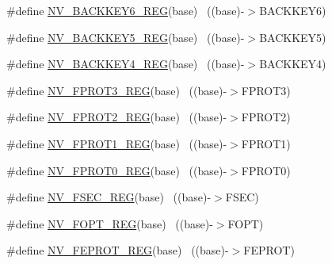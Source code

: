\begin{DoxyCompactItemize}
\item 
\#define \hyperlink{group___n_v___register___accessor___macros_ga9d64e9e2568804d0cf1de4cb5a1d3f1f}{N\+V\+\_\+\+B\+A\+C\+K\+K\+E\+Y6\+\_\+\+R\+EG}(base)                                    ~((base)-\/$>$B\+A\+C\+K\+K\+E\+Y6)
\item 
\#define \hyperlink{group___n_v___register___accessor___macros_gaeeb967dc21f8077cef911eae743d7f12}{N\+V\+\_\+\+B\+A\+C\+K\+K\+E\+Y5\+\_\+\+R\+EG}(base)                                    ~((base)-\/$>$B\+A\+C\+K\+K\+E\+Y5)
\item 
\#define \hyperlink{group___n_v___register___accessor___macros_gae867c53e6918c6a7c16ccba9ee512dc1}{N\+V\+\_\+\+B\+A\+C\+K\+K\+E\+Y4\+\_\+\+R\+EG}(base)                                    ~((base)-\/$>$B\+A\+C\+K\+K\+E\+Y4)
\item 
\#define \hyperlink{group___n_v___register___accessor___macros_gad8e367bb2e9aae8570a3736ec8a4aee9}{N\+V\+\_\+\+F\+P\+R\+O\+T3\+\_\+\+R\+EG}(base)                                        ~((base)-\/$>$F\+P\+R\+O\+T3)
\item 
\#define \hyperlink{group___n_v___register___accessor___macros_gae06ab638a7b4ad4757c89118971127d0}{N\+V\+\_\+\+F\+P\+R\+O\+T2\+\_\+\+R\+EG}(base)                                        ~((base)-\/$>$F\+P\+R\+O\+T2)
\item 
\#define \hyperlink{group___n_v___register___accessor___macros_ga1f9fafcb15ed5d1b27020f5b04edfe00}{N\+V\+\_\+\+F\+P\+R\+O\+T1\+\_\+\+R\+EG}(base)                                        ~((base)-\/$>$F\+P\+R\+O\+T1)
\item 
\#define \hyperlink{group___n_v___register___accessor___macros_ga04dc6fb630cffc56b5fff1847704cc53}{N\+V\+\_\+\+F\+P\+R\+O\+T0\+\_\+\+R\+EG}(base)                                        ~((base)-\/$>$F\+P\+R\+O\+T0)
\item 
\#define \hyperlink{group___n_v___register___accessor___macros_gafcfd540f11abf7f4644b7c5a5bc272fe}{N\+V\+\_\+\+F\+S\+E\+C\+\_\+\+R\+EG}(base)                                            ~((base)-\/$>$F\+S\+EC)
\item 
\#define \hyperlink{group___n_v___register___accessor___macros_ga66cb061090c7bd7c8b2447b133a93ce5}{N\+V\+\_\+\+F\+O\+P\+T\+\_\+\+R\+EG}(base)                                            ~((base)-\/$>$F\+O\+PT)
\item 
\#define \hyperlink{group___n_v___register___accessor___macros_ga689f6db632fecfda17b3a0af63529b29}{N\+V\+\_\+\+F\+E\+P\+R\+O\+T\+\_\+\+R\+EG}(base)                                        ~((base)-\/$>$F\+E\+P\+R\+OT)

\end{DoxyCompactItemize}
